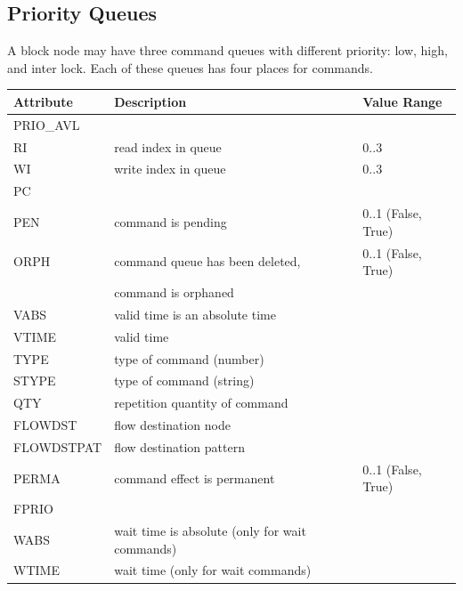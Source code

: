 \subsection{Priority Queues}
A block node may have three command queues with different priority: low, high, and inter lock. Each of these queues has four places for commands.
\begin{center}
  \begin{tabular}{| l | l | l |}
    \hline
Attribute & Description & Value Range \\ \hline
PRIO\_AVL & & \\ \hline
RI & read index in queue & 0..3 \\ \hline
WI & write index in queue & 0..3 \\ \hline
PC & & \\ \hline
PEN & command is pending & 0..1 (False, True) \\ \hline
ORPH & command queue has been deleted, & 0..1 (False, True) \\
& command is orphaned & \\ \hline
VABS & valid time is an absolute time & \\ \hline
VTIME & valid time & \\ \hline
TYPE & type of command (number) & \\ \hline
STYPE & type of command (string) & \\ \hline
QTY & repetition quantity of command & \\ \hline
FLOWDST & flow destination node & \\ \hline
FLOWDSTPAT & flow destination pattern & \\ \hline
PERMA & command effect is permanent & 0..1 (False, True) \\ \hline
FPRIO & &  \\ \hline
WABS & wait time is absolute (only for wait commands) & \\ \hline
WTIME & wait time (only for wait commands) & \\ \hline
  \end{tabular}
\end{center}
